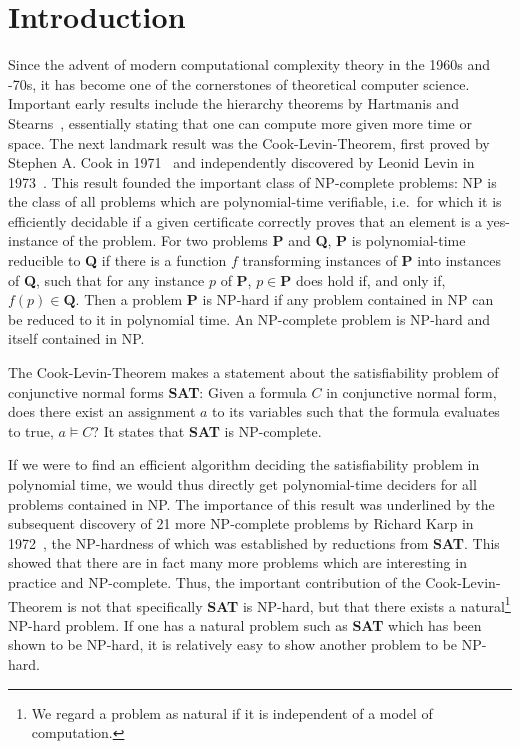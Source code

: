 \chapter{Introduction}\label{chap:introduction}
\newcommand{\SAT}{\textbf{SAT}}
\newcommand{\Clique}{\textbf{Clique}}
\newcommand{\NP}{\textsf{NP}}
\newcommand{\PC}{\textsf{P}}

Since the advent of modern computational complexity theory in the 1960s and -70s, it has become one of the cornerstones of theoretical computer science. 
Important early results include the hierarchy theorems by Hartmanis and Stearns~\cite{hartmanis_stearns}, essentially stating that one can compute more given more time or space. 
The next landmark result was the Cook-Levin-Theorem, first proved by Stephen A. Cook in 1971~\cite{cook_theorem} and independently discovered by Leonid Levin in 1973~\cite{levin_theorem}. 
This result founded the important class of \NP{}-complete problems: \NP{} is the class of all problems which are polynomial-time verifiable, i.e.\ for which it is efficiently decidable if a given certificate correctly proves that an element is a yes-instance of the problem. For two problems \textbf{P} and \textbf{Q}, \textbf{P} is polynomial-time reducible to \textbf{Q} if there is a function $f$ transforming instances of \textbf{P} into instances of \textbf{Q}, such that for any instance $p$ of \textbf{P}, $p \in \textbf{P}$ does hold if, and only if, $f(p) \in \textbf{Q}$. 
Then a problem \textbf{P} is \NP{}-hard if any problem contained in \NP{} can be reduced to it in polynomial time. An \NP{}-complete problem is \NP{}-hard and itself contained in \NP{}.  

The Cook-Levin-Theorem makes a statement about the satisfiability problem of conjunctive normal forms \SAT{}: 
Given a formula $C$ in conjunctive normal form, does there exist an assignment $a$ to its variables such that the formula evaluates to \textsf{true}, $a \models C$?
It states that \SAT{} is \NP{}-complete. 

If we were to find an efficient algorithm deciding the satisfiability problem in polynomial time, we would thus directly get polynomial-time deciders for all problems contained in \NP{}. 
The importance of this result was underlined by the subsequent discovery of 21 more \NP{}-complete problems by Richard Karp in 1972~\cite{Karp1972}, the \NP{}-hardness of which was established by reductions from \textbf{SAT}. This showed that there are in fact many more problems which are interesting in practice and \NP{}-complete. 
Thus, the important contribution of the Cook-Levin-Theorem is not that specifically \SAT{} is \NP{}-hard, but that there exists a natural\footnote{We regard a problem as natural if it is independent of a model of computation.} \NP{}-hard problem. If one has a natural problem such as \SAT{} which has been shown to be \NP{}-hard, it is relatively easy to show another problem to be \NP{}-hard.

